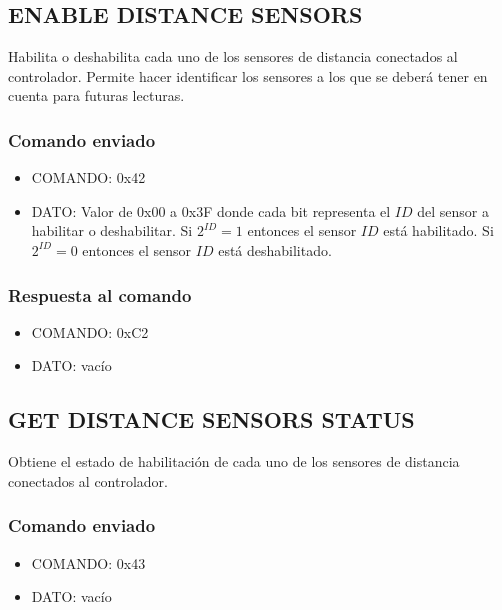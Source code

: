 \documentclass[a4paper,10pt]{article}
\begin{document}
\subsection{ENABLE DISTANCE SENSORS}
\label{enable_distance_sensors}

Habilita o deshabilita cada uno de los sensores de distancia conectados al controlador.
Permite hacer identificar los sensores a los que se deber\'a tener en cuenta para futuras lecturas.

\subsubsection*{Comando enviado}

\begin{itemize}
	\item{COMANDO:} 0x42
	\item{DATO:} Valor de 0x00 a 0x3F donde cada bit representa el $ID$ del sensor a habilitar o deshabilitar.
	Si $2^{ID} = 1$ entonces el sensor $ID$ est\'a habilitado.
	Si $2^{ID} = 0$ entonces el sensor $ID$ est\'a deshabilitado.
\end{itemize}

\subsubsection*{Respuesta al comando}

\begin{itemize}
	\item{COMANDO:} 0xC2
	\item{DATO:} vac\'io
\end{itemize}

\subsection{GET DISTANCE SENSORS STATUS}
\label{get_status_distance_sensors}

Obtiene el estado de habilitaci\'on de cada uno de los sensores de distancia conectados al controlador.

\subsubsection*{Comando enviado}

\begin{itemize}
	\item{COMANDO:} 0x43
	\item{DATO:} vac\'io
\end{itemize}
\end{document}
